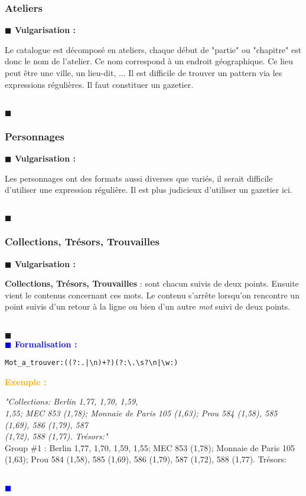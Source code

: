 \documentclass[a4paper, 11pt]{article}
\newenvironment{vulgarisation}
    {
    \textbf{\textcolor{dark-blue}{$\blacksquare$  Vulgarisation : \\}}

    }
    {
    ~\\\textcolor{dark-blue}{$\blacksquare$}\\
    }
\newenvironment{formalisation}
    {
    \textbf{\textcolor{blue}{$\blacksquare$  Formalisation : \\}}
    }
    {
    ~\\\textcolor{blue}{$\blacksquare$}\\
    }
\newenvironment{exemple}
    {
    \textbf{\textcolor{orange}{
    Exemple : \\}}
    }
    {\\
    }
\begin{document}
\subsubsection{Ateliers}
\begin{vulgarisation}
	Le catalogue est décomposé en ateliers, chaque début de "partie" ou "chapitre" est donc le nom de l'atelier. Ce nom correspond à un endroit géographique. Ce lieu peut être une ville, un lieu-dit, ... Il est difficile de trouver un pattern via les expressions régulières. Il faut constituer un gazetier.
\end{vulgarisation}

\subsubsection{Personnages}
\begin{vulgarisation}
	Les personnages ont des formats aussi diverses que variés, il serait difficile d'utiliser une expression régulière. Il est plus judicieux d'utiliser un gazetier ici. 
\end{vulgarisation}

\subsubsection{Collections, Trésors, Trouvailles}
\begin{vulgarisation}
	\textbf{Collections, Trésors, Trouvailles} : sont chacun suivis de deux points. Ensuite vient le contenus concernant ces mots. Le contenu s'arrête lorsqu'on rencontre un point suivis d'un retour à la ligne ou bien d'un autre \textit{mot} suivi de deux points.
\end{vulgarisation}
\begin{formalisation}
	\begin{verbatim}
Mot_a_trouver:((?:.|\n)+?)(?:\.\s?\n|\w:)
	\end{verbatim}
	\begin{exemple}
		\emph{"Collections: Berlin 1,77, 1,70, 1,59, \\
			1,55; MEC 853 (1,78); Monnaie de Paris 105 (1,63); Prou 584 (1,58), 585 (1,69), 586 (1,79), 587 \\
			(1,72), 588 (1,77). Trésors:"}\\
		Group \#1 :  Berlin 1,77, 1,70, 1,59,
		1,55; MEC 853 (1,78); Monnaie de Paris 105 (1,63); Prou 584 (1,58), 585 (1,69), 586 (1,79), 587 (1,72), 588 (1,77). Trésors:
	\end{exemple}
\end{formalisation}
\end{document}
